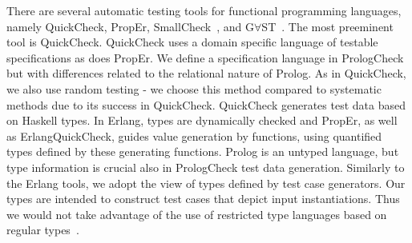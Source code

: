 \documentclass[runningheads,a4paper]{../../PaperStyles/llncs}
\newcommand{\todo}[2][?]{\marginpar{\raggedright \tiny TODO: #2}}
\newcommand{\Prolog}[0]{{\sf Prolog}}
\newcommand{\Haskell}[0]{{\sf Haskell}}
\newcommand{\QuickCheck}[0]{{\sf QuickCheck}}
\newcommand{\plqc}[0]{{\sf PrologCheck}}
\begin{document}
There are several automatic testing tools for functional programming
languages, namely \QuickCheck, {\sf PropEr}, {\sf SmallCheck}~\cite{runciman2008smallcheck},
and G$\forall$ST~\cite{koopman2003gast}.
The %
most preeminent tool is \QuickCheck{}.
%
\QuickCheck{} uses a domain specific language of testable specifications
as does {\sf PropEr}.
%
We define a specification language in \plqc{} but with
differences related to the relational nature of \Prolog{}. %
As in \QuickCheck{}, we also use random testing - we choose this method
compared to systematic methods due to its success in \QuickCheck{}.
%
\QuickCheck{} generates test data %
based
on \Haskell{} types.
In {\sf Erlang}, types are dynamically checked and {\sf PropEr}, as well
as {\sf Erlang}\QuickCheck{}, guides value generation by functions,
using quantified types defined by these generating functions.
%
\Prolog{} is an untyped language, but type information is crucial also in
\plqc{} test data generation.
%
Similarly to the {\sf Erlang} tools, we adopt the view of types defined
by test case generators.
%
Our types are intended to construct test cases that depict input
instantiations.
%
Thus we would not take advantage of the use of restricted type languages
based on regular types~\cite{Yardeni:1991:TSL:110703.110705,fruhwirth1991logic,DBLP:conf/iclp/Zobel87,florido1992types}.


\end{document}
